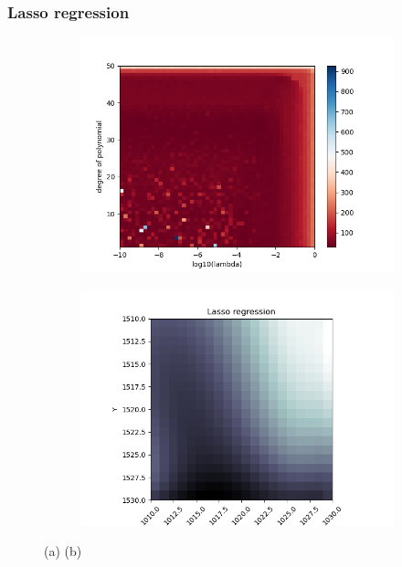 \documentclass[../main.tex]{subfiles}
\begin{document}
\subsubsection{Lasso regression}

\begin{figure}[htb] 
   \centering
   \begin{subfigure}[b]{0.45\textwidth}
    \centering
    \includegraphics[width=\textwidth]{../assets/terrain-lasso-degree-lambda-colormap.png} 
    \caption{}
    
   \end{subfigure}
   \quad
   \begin{subfigure}[b]{0.45\textwidth}
    \centering
    \includegraphics[width=\textwidth]{../assets/Terrain_lasso_bestdegree.png} 
    \caption{}
   \end{subfigure}
   \caption{(a) (b) 
   }
   \label{fig:terrain-lasso}
\end{figure} 
\end{document}
